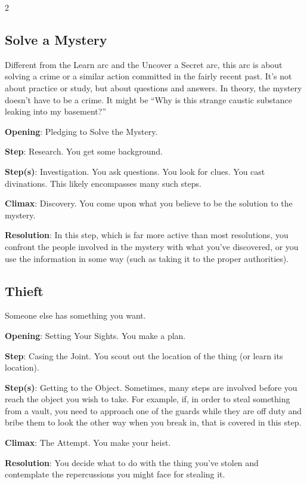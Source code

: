 \begin{multicols}{2}
\subsection{Solve a Mystery}

Different from the Learn arc and the Uncover a Secret arc, this arc is about solving a crime or a similar action committed in the fairly recent past. It’s not about practice or study, but about questions and answers. In theory, the mystery doesn’t have to be a crime. It might be “Why is this strange caustic substance leaking into my basement?”

\textbf{Opening}: Pledging to Solve the Mystery. 

\textbf{Step}: Research. You get some background.

\textbf{Step(s)}: Investigation. You ask questions. You look for clues. You cast divinations. This likely encompasses many such steps.

\textbf{Climax}: Discovery. You come upon what you believe to be the solution to the mystery. 

\textbf{Resolution}: In this step, which is far more active than most resolutions, you confront the people involved in the mystery with what you’ve discovered, or you use the information in some way (such as taking it to the proper authorities).

\subsection{Thieft}

Someone else has something you want.

\textbf{Opening}: Setting Your Sights. You make a plan. 

\textbf{Step}: Casing the Joint. You scout out the location of the thing (or learn its location).

\textbf{Step(s)}: Getting to the Object. Sometimes, many steps are involved before you reach the object you wish to take. For example, if, in order to steal something from a vault, you need to approach one of the guards while they are off duty and bribe them to look the other way when you break in, that is covered in this step.

\textbf{Climax}: The Attempt. You make your heist. 

\textbf{Resolution}: You decide what to do with the thing you’ve stolen and contemplate the repercussions you might face for stealing it.


\end{multicols}

